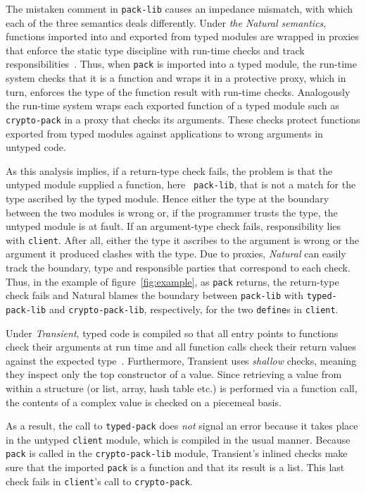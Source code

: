 The mistaken comment in {\tt pack-lib} causes an impedance mismatch, with which each
of the three semantics deals differently.  Under {\it the Natural semantics\/},
functions imported into and exported from typed modules are wrapped in proxies that
enforce the static type discipline with run-time checks and track
responsibilities~\citep{tf-popl-2008, tfffgksst-snapl-2017}. Thus, when {\tt pack}
is imported into a typed module, the run-time system checks that it is a function
and wraps it in a protective proxy, which in turn, enforces the type of the function
result with run-time checks.  Analogously the run-time system wraps each exported
function of a typed module such as {\tt crypto-pack} in a proxy that checks its
arguments.  These checks protect functions exported from typed modules against
applications to wrong arguments in untyped code.

As this analysis implies, if a return-type check fails, the problem is
that the untyped module supplied a function, here {\tt
pack-lib}, that is not a  match for the type ascribed by the typed module. 
Hence either the type at the boundary between the two modules is wrong or, 
if the programmer trusts the type, the untyped module is at fault.
If an argument-type check fails, responsibility  lies with
{\tt client}. After all, either the type it ascribes to the argument is
wrong or the argument it produced clashes with the type. Due to 
proxies, {\it Natural\/} can easily track the 
boundary, type and responsible parties that correspond to each check. 
Thus, in the example of figure~\ref{fig:example}, as
\texttt{pack} returns, the return-type check fails and Natural blames
the boundary between \texttt{pack-lib} with {\tt typed-pack-lib} and
{\tt crypto-pack-lib}, respectively, for the two {\tt define}s in {\tt client}.

Under {\it Transient\/}, typed code is compiled so that all entry points to
functions check their arguments at run time and all function calls check their
return values against the expected type~\citep{vss-popl-2017}.  Furthermore,
Transient uses \emph{shallow} checks, meaning they inspect only the top
constructor of a value. Since retrieving a value from within a structure (or
list, array, hash table etc.) is performed via a function call, the contents of
a complex value is checked on a piecemeal basis.

As a result, the call to \texttt{typed-pack} does {\em not\/} signal an error
because it takes place in the untyped {\tt client} module, which is compiled in
the usual manner. Because {\tt pack} is called in the {\tt crypto-pack-lib}
module, Transient's inlined checks make sure that the imported
\texttt{pack} is a function and that its result is a list. This
last check fails in \texttt{client}'s call to {\tt crypto-pack}.

